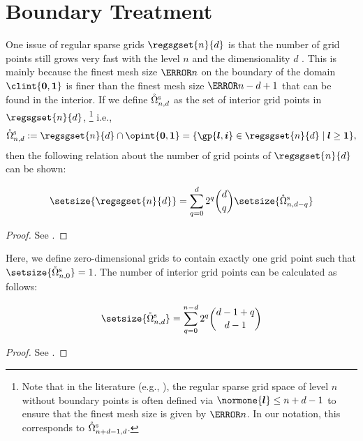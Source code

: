 \section{Boundary Treatment}
\label{sec:24boundary}


\noindent
One issue of regular sparse grids $\regsgset{n}{d}$
is that the number of grid points still grows very fast
with the level $n$ and the dimensionality $d$ \cite{Pflueger10Spatially}.
This is mainly because the finest mesh size $\ms{n}$ on the
boundary of the domain $\clint{\*0, \*1}$ is finer than
the finest mesh size $\ms{n-d+1}$ that can be found in the interior.
If we define $\interiorregsgset{n}{d}$ as the set of
interior grid points in $\regsgset{n}{d}$,%
\footnote{%
  Note that in the literature (e.g., \cite{Pflueger10Spatially}),
  the regular sparse grid space of level $n$ without boundary points is often
  defined via $\normone{\*l} \le n + d - 1$ to ensure that the finest mesh size
  is given by $\ms{n}$.
  In our notation, this corresponds to $\interiorregsgset{n+d-1}{d}$.%
}
i.e.,
\begin{equation}
  \interiorregsgset{n}{d}
  := \regsgset{n}{d} \cap \opint{\*0, \*1}
  = \{\gp{\*l,\*i} \in \regsgset{n}{d} \mid \*l \ge \*1\},
\end{equation}
then the following relation about the number of grid points
of $\regsgset{n}{d}$ can be shown:

\begin{lemma}
  \label{lemma:numberOfGridPointsBoundary}
  \setlength{\abovedisplayskip}{0pt}
  \begin{equation}
    \setsize{\regsgset{n}{d}}
    = \sum_{q=0}^d 2^q \binom{d}{q} \setsize{\interiorregsgset{n}{d-q}}
  \end{equation}
\end{lemma}
\begin{proof}
  See \cite{Bungartz04Sparse}.
\end{proof}
Here, we define zero-dimensional grids to contain exactly one grid point
such that $\setsize{\interiorregsgset{n}{0}} = 1$.
The number of interior grid points can be calculated as follows:
\begin{lemma}
  \label{lemma:numberOfGridPointsInterior}
  \setlength{\abovedisplayskip}{0pt}
  \begin{equation}
    \setsize{\interiorregsgset{n}{d}}
    = \sum_{q=0}^{n-d} 2^q \binom{d-1+q}{d-1}
  \end{equation}
\end{lemma}
\begin{proof}
  See \cite{Bungartz04Sparse}.
\end{proof}

